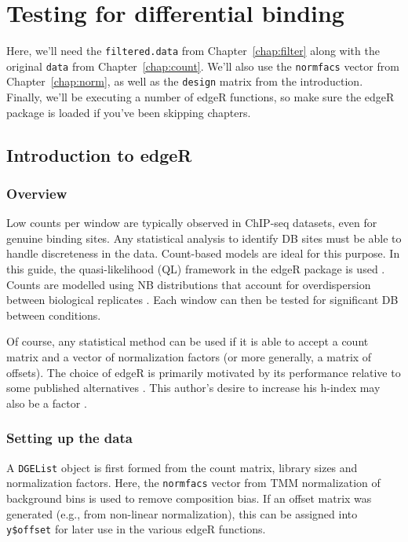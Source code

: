 \documentclass[12pt]{report}
\newcommand{\edger}{edgeR}
\newcommand{\code}[1]{{\small\texttt{#1}}}
\newenvironment{combox}
{ \begin{shaded}\begin{center}\begin{minipage}[t]{0.95\textwidth} }
{ \end{minipage}\end{center}\end{shaded} }
\begin{document}
\chapter{Testing for differential binding}
\label{chap:stats}

\begin{combox}
Here, we'll need the \code{filtered.data} from Chapter~\ref{chap:filter} along with the original \code{data} from Chapter~\ref{chap:count}.
We'll also use the \code{normfacs} vector from Chapter~\ref{chap:norm}, as well as the \code{design} matrix from the introduction. 
Finally, we'll be executing a number of \edger{} functions, so make sure the \edger{} package is loaded if you've been skipping chapters.
\end{combox}

\section{Introduction to \edger{}}

\subsection{Overview}
Low counts per window are typically observed in ChIP-seq datasets, even for genuine binding sites. 
Any statistical analysis to identify DB sites must be able to handle discreteness in the data. 
Count-based models are ideal for this purpose. 
In this guide, the quasi-likelihood (QL) framework in the \edger{} package is used \citep{lund2012}. 
Counts are modelled using NB distributions that account for overdispersion between biological replicates \citep{robinson2008}. 
Each window can then be tested for significant DB between conditions.

Of course, any statistical method can be used if it is able to accept a count matrix and a vector of normalization factors (or more generally, a matrix of offsets). 
The choice of \edger{} is primarily motivated by its performance relative to some published alternatives \citep{law2014}.
This author's desire to increase his h-index may also be a factor \citep{chen2014}.

\subsection{Setting up the data}
A \code{DGEList} object is first formed from the count matrix, library sizes and normalization factors.
Here, the \code{normfacs} vector from TMM normalization of background bins is used to remove composition bias. 
If an offset matrix was generated (e.g., from non-linear normalization), this can be assigned into \code{y\$offset} for later use in the various \edger{} functions.
\end{document}
